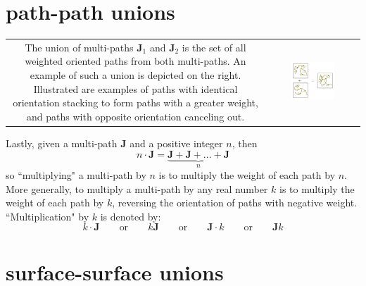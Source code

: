 \documentclass{book}
\begin{document}
\section{path-path unions}

\vspace{5mm}

\begin{tabular}{cc}
\parbox{0.5\textwidth}{
The union of multi-paths \(\mathbf{J}_1\) and \(\mathbf{J}_2\) is the set of all weighted oriented paths from both multi-paths. An example of such a union is depicted on the right. Illustrated are examples of paths with identical orientation stacking to form paths with a greater weight, and paths with opposite orientation canceling out.
} & \parbox{0.5\textwidth}{
\includegraphics[width = 0.5\textwidth]{Unions/multipath_unions}
}
\end{tabular}

Lastly, given a multi-path \(\mathbf{J}\) and a positive integer \(n\), then
\[n \cdot \mathbf{J} = \underbrace{\mathbf{J} + \mathbf{J} + ... + \mathbf{J}}_n\]
so ``multiplying" a multi-path by \(n\) is to multiply the weight of each path by \(n\). More generally, to multiply a multi-path by any real number \(k\) is to multiply the weight of each path by \(k\), reversing the orientation of paths with negative weight. ``Multiplication" by \(k\) is denoted by:
\[k \cdot \mathbf{J} \quad\quad\text{or}\quad\quad k\mathbf{J} \quad\quad\text{or}\quad\quad \mathbf{J} \cdot k \quad\quad\text{or}\quad\quad \mathbf{J} k\]


\section{surface-surface unions}

\vspace{5mm}
\end{document}

